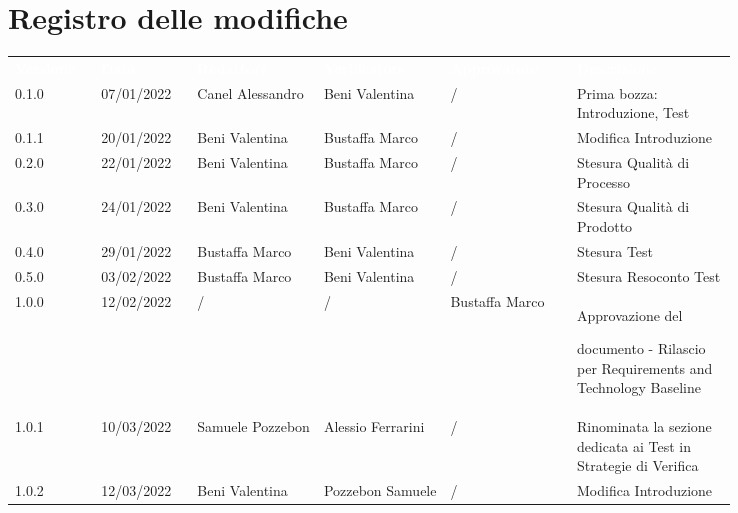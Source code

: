 \section*{Registro delle modifiche}

{\renewcommand{\arraystretch}{1.5}
\scriptsize
\begin{tabular}{p{0.10\linewidth}p{0.10\linewidth}p{0.15\linewidth}p{0.15\linewidth}p{0.15\linewidth}p{0.19\linewidth}}
	\rowcolor[RGB]{33, 73, 50}
	\textcolor{white}{\textbf{Versione}} & \textcolor{white}{\textbf{Data}} &
	\textcolor{white}{\textbf{Redattore}} & \textcolor{white}{\textbf{Verificatore}} &
	\textcolor{white}{\textbf{Approvatore}} & \textcolor{white}{\textbf{Descrizione}}\\
	\rowcolor[RGB]{216, 235, 171}
	0.1.0 & 07/01/2022 & Canel Alessandro& Beni Valentina &/& Prima bozza: Introduzione, Test\\
	\rowcolor[RGB]{233, 245, 206}
	0.1.1 & 20/01/2022 & Beni Valentina& Bustaffa Marco &/& Modifica Introduzione\\
	\rowcolor[RGB]{216, 235, 171}
	0.2.0 & 22/01/2022 & Beni Valentina& Bustaffa Marco &/& Stesura Qualità di Processo\\
	\rowcolor[RGB]{233, 245, 206}
	0.3.0 & 24/01/2022 & Beni Valentina& Bustaffa Marco &/& Stesura Qualità di Prodotto\\
	\rowcolor[RGB]{216, 235, 171}
	0.4.0 & 29/01/2022 & Bustaffa Marco& Beni Valentina &/& Stesura Test\\
	\rowcolor[RGB]{233, 245, 206}
	0.5.0 & 03/02/2022 & Bustaffa Marco& Beni Valentina &/& Stesura Resoconto Test\\
	\rowcolor[RGB]{216, 235, 171}
	1.0.0 & 12/02/2022 & / & / & Bustaffa Marco & Approvazione del \par documento - Rilascio per Requirements and Technology Baseline\\ 
	\rowcolor[RGB]{233, 245, 206}
  1.0.1 & 10/03/2022 & Samuele Pozzebon & Alessio Ferrarini &/& Rinominata la
  sezione dedicata ai Test in Strategie di Verifica\\
  \rowcolor[RGB]{216, 235, 171}
	1.0.2 & 12/03/2022 & Beni Valentina & Pozzebon Samuele & /& Modifica Introduzione\\
\end{tabular}
}
